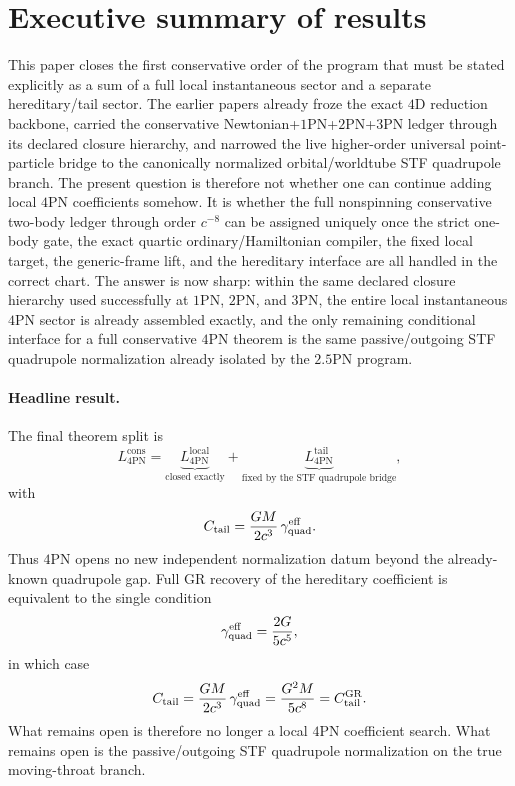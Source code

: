 \documentclass[11pt]{article}
\begin{document}

\section{Executive summary of results}
\label{sec:executive-summary}

This paper closes the first conservative order of the program that must be
stated explicitly as a sum of a full local instantaneous sector and a separate
hereditary/tail sector.  The earlier papers already froze the exact $4$D
reduction backbone, carried the conservative Newtonian+$1$PN+$2$PN+$3$PN ledger
through its declared closure hierarchy, and narrowed the live higher-order
universal point-particle bridge to the canonically normalized orbital/worldtube
STF quadrupole branch.  The present question is therefore not whether one can
continue adding local $4$PN coefficients somehow.  It is whether the full
nonspinning conservative two-body ledger through order $c^{-8}$ can be assigned
uniquely once the strict one-body gate, the exact quartic
ordinary/Hamiltonian compiler, the fixed local target, the generic-frame lift,
and the hereditary interface are all handled in the correct chart.  The answer
is now sharp: within the same declared closure hierarchy used successfully at
$1$PN, $2$PN, and $3$PN, the entire local instantaneous $4$PN sector is already
assembled exactly, and the only remaining conditional interface for a full
conservative $4$PN theorem is the same passive/outgoing STF quadrupole
normalization already isolated by the $2.5$PN program.

\paragraph{Headline result.}
The final theorem split is
\[
L_{4\mathrm{PN}}^{\mathrm{cons}}
=
\underbrace{L_{4\mathrm{PN}}^{\mathrm{local}}}_{\text{closed exactly}}
+
\underbrace{L_{4\mathrm{PN}}^{\mathrm{tail}}}_{\text{fixed by the STF quadrupole bridge}},
\]
with
\[
C_{\rm tail}=\frac{GM}{2c^3}\,\gamma_{\rm quad}^{\rm eff}.
\]
Thus $4$PN opens no new independent normalization datum beyond the already-known
quadrupole gap.  Full GR recovery of the hereditary coefficient is equivalent to
the single condition
\[
\gamma_{\rm quad}^{\rm eff}=\frac{2G}{5c^5},
\]
in which case
\[
C_{\rm tail}
=
\frac{GM}{2c^3}\,\gamma_{\rm quad}^{\rm eff}
=
\frac{G^2M}{5c^8}
=
C_{\rm tail}^{\rm GR}.
\]
What remains open is therefore no longer a local $4$PN coefficient search.
What remains open is the passive/outgoing STF quadrupole normalization on the
true moving-throat branch.
\end{document}
